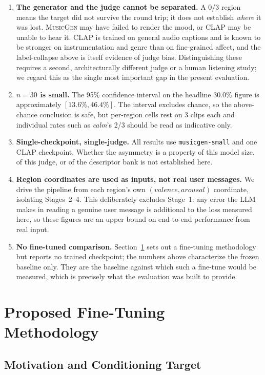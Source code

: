 \documentclass[11pt]{article}
\newcommand{\musicgen}{\textsc{MusicGen}}
\begin{document}
\begin{enumerate}[leftmargin=*]
    \item \textbf{The generator and the judge cannot be separated.} A 0/3 region means the target did not survive the round trip; it does not establish \emph{where} it was lost. \musicgen{} may have failed to render the mood, or CLAP may be unable to hear it. CLAP is trained on general audio captions and is known to be stronger on instrumentation and genre than on fine-grained affect, and the label-collapse above is itself evidence of judge bias. Distinguishing these requires a second, architecturally different judge or a human listening study; we regard this as the single most important gap in the present evaluation.
    \item \textbf{$n = 30$ is small.} The 95\% confidence interval on the headline 30.0\% figure is approximately $[13.6\%, 46.4\%]$. The interval excludes chance, so the above-chance conclusion is safe, but per-region cells rest on 3 clips each and individual rates such as \emph{calm}'s 2/3 should be read as indicative only.
    \item \textbf{Single-checkpoint, single-judge.} All results use \texttt{musicgen-small} and one CLAP checkpoint. Whether the asymmetry is a property of this model size, of this judge, or of the descriptor bank is not established here.
    \item \textbf{Region coordinates are used as inputs, not real user messages.} We drive the pipeline from each region's own $(valence, arousal)$ coordinate, isolating Stages~2--4. This deliberately excludes Stage~1: any error the LLM makes in reading a genuine user message is additional to the loss measured here, so these figures are an upper bound on end-to-end performance from real input.
    \item \textbf{No fine-tuned comparison.} Section~\ref{sec:finetune} sets out a fine-tuning methodology but reports no trained checkpoint; the numbers above characterize the frozen baseline only. They are the baseline against which such a fine-tune would be measured, which is precisely what the evaluation was built to provide.
\end{enumerate}

\section{Proposed Fine-Tuning Methodology}
\label{sec:finetune}

\subsection{Motivation and Conditioning Target}
\end{document}
